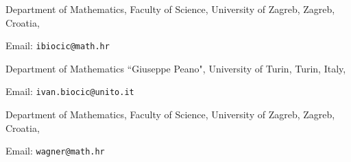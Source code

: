 \documentclass[12pt,a4paper,onecolumn]{article}
\theoremstyle{definition}
\newcommand{\1}{\mathbf 1}
\numberwithin{equation}{section}
\begin{document}
	
	
	



	\bigskip
	
	
	\noindent Department of Mathematics, Faculty of Science, University of Zagreb, Zagreb, Croatia,
	
	\noindent Email: \texttt{ibiocic@math.hr}
    
        \noindent Department of Mathematics ``Giuseppe Peano", University of Turin, Turin, Italy,
	
	\noindent Email: \texttt{ivan.biocic@unito.it}
	
	\bigskip
	
	
	\noindent Department of Mathematics, Faculty of Science, University of Zagreb, Zagreb, Croatia,
	
	\noindent Email: \texttt{wagner@math.hr}
\end{document}
